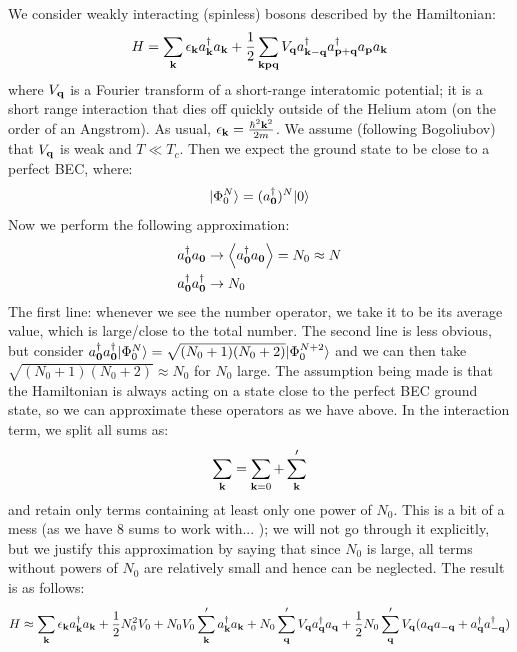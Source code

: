 We consider weakly interacting (spinless) bosons described by the Hamiltonian:
\begin{equation}
    H = \sum_{\mathbf{k}} \epsilon_{\mathbf{k}}a^{\dagger}_{\mathbf{k}}a_{\mathbf{k}} + \frac{1}{2}\sum_{\mathbf{k}\mathbf{p}\mathbf{q}}V_{\mathbf{q}}a^\dagger_{\mathbf{k} - \mathbf{q}}a^{\dagger}_{\mathbf{p} + \mathbf{q}}a_{\mathbf{p}}a_{\mathbf{k}}
\end{equation}
where $V_{\mathbf{q}}$ is a Fourier transform of a short-range interatomic potential; it is a short range interaction that dies off quickly outside of the Helium atom (on the order of an Angstrom). As usual, $\epsilon_{\mathbf{k}} = \frac{\hbar^2\mathbf{k}^2}{2m}$. We assume (following Bogoliubov) that $V_{\mathbf{q}}$ is weak and $T \ll T_c$. Then we expect the ground state to be close to a perfect BEC, where:
\begin{equation}
    \lvert \Phi^N_0 \rangle = (a^\dagger_{\mathbf{0}})^N\lvert 0 \rangle
\end{equation}
Now we perform the following approximation:
\begin{equation}\label{eq-Napproxbogo}
    \begin{split}
        &a^\dagger_{\mathbf{0}}a_{\mathbf{0}} \to \left< a^\dagger_{\mathbf{0}}a_{\mathbf{0}} \right> = N_0 \approx N
        \\&a^\dagger_{\mathbf{0}}a^\dagger_{\mathbf{0}} \to N_0
    \end{split}
\end{equation}
The first line: whenever we see the number operator, we take it to be its average value, which is large/close to the total number. The second line is less obvious, but consider $a_{\mathbf{0}}^\dagger a_{\mathbf{0}}^\dagger \lvert \Phi_0^N \rangle = \sqrt{(N_0 + 1)(N_0 + 2)}\lvert \Phi_0^{N+2} \rangle$ and we can then take $\sqrt{(N_0 + 1)(N_0 + 2)} \approx N_0$ for $N_0$ large. The assumption being made is that the Hamiltonian is always acting on a state close to the perfect BEC ground state, so we can approximate these operators as we have above. In the interaction term, we split all sums as:
\begin{align*}
    \sum_{\mathbf{k}} = \sum_{\mathbf{k} = 0} + \sum_{\mathbf{k}}'
\end{align*}
and retain only terms containing at least only one power of $N_0$. This is a bit of a mess (as we have 8 sums to work with... ); we will not go through it explicitly, but we justify this approximation by saying that since $N_0$ is large, all terms without powers of $N_0$ are relatively small and hence can be neglected. The result is as follows:
\begin{equation}
    H \approx \sum_{\mathbf{k}}\epsilon_{\mathbf{k}}a^\dagger_{\mathbf{k}}a_{\mathbf{k}} + \frac{1}{2}N_0^2 V_0 + N_0V_0\sum_{\mathbf{k}}' a_{\mathbf{k}}^\dagger a_{\mathbf{k}} + N_0\sum_{\mathbf{q}}'V_{\mathbf{q}}a^\dagger_{\mathbf{q}}a_{\mathbf{q}} + \frac{1}{2}N_0\sum_{\mathbf{q}}' V_{\mathbf{q}}(a_{\mathbf{q}}a_{-\mathbf{q}} + a_{\mathbf{q}}^\dagger a_{-\mathbf{q}}^\dagger)
\end{equation}
